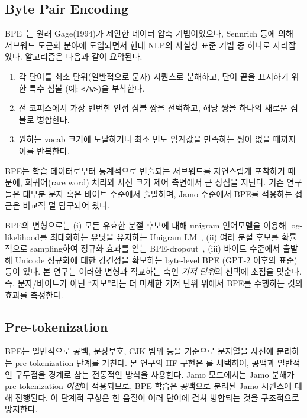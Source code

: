 \documentclass[sigconf,nonacm]{acmart}
\begin{document}
\subsection{Byte Pair Encoding}

BPE~\cite{sennrich2016bpe}는 원래 Gage(1994)가 제안한 데이터 압축 기법이었으나,
Sennrich 등에 의해 서브워드 토큰화 분야에 도입되면서 현대 NLP의 사실상 표준 기법 중 하나로
자리잡았다. 알고리즘은 다음과 같이 요약된다.
\begin{enumerate}
    \item 각 단어를 최소 단위(일반적으로 문자) 시퀀스로 분해하고, 단어 끝을 표시하기 위한 특수
    심볼 (예: \texttt{</w>})을 부착한다.
    \item 전 코퍼스에서 가장 빈번한 인접 심볼 쌍을 선택하고, 해당 쌍을 하나의 새로운 심볼로 병합한다.
    \item 원하는 vocab 크기에 도달하거나 최소 빈도 임계값을 만족하는 쌍이 없을 때까지 이를 반복한다.
\end{enumerate}
BPE는 학습 데이터로부터 통계적으로 빈출되는 서브워드를 자연스럽게 포착하기 때문에,
희귀어(rare word) 처리와 사전 크기 제어 측면에서 큰 장점을 지닌다. 기존 연구들은 대부분
문자 혹은 바이트 수준에서 출발하며, Jamo 수준에서 BPE를 적용하는 접근은 비교적 덜 탐구되어 왔다.

BPE의 변형으로는 (i) 모든 유효한 분절 후보에 대해 unigram 언어모델을 이용해 log-likelihood를
최대화하는 유닛을 유지하는 Unigram LM~\cite{kudo2018sp}, (ii) 여러 분절 후보를 확률적으로
sampling하여 정규화 효과를 얻는 BPE-dropout~\cite{provilkov2020bpedropout},
(iii) 바이트 수준에서 출발해 Unicode 정규화에 대한 강건성을 확보하는 byte-level BPE
(GPT-2 이후의 표준)~\cite{radford2019gpt2} 등이 있다. 본 연구는 이러한 변형과 직교하는 축인
\emph{기저 단위}의 선택에 초점을 맞춘다. 즉, 문자/바이트가 아닌 ``자모''라는 더 미세한 기저 단위
위에서 BPE를 수행하는 것의 효과를 측정한다.

\subsection{Pre-tokenization}

BPE는 일반적으로 공백, 문장부호, CJK 범위 등을 기준으로 문자열을 사전에 분리하는 pre-tokenization
단계를 거친다. 본 연구의 HF 구현은 를 채택하여,
공백과 일반적인 구두점을 경계로 삼는 전통적인 방식을 사용한다. Jamo 모드에서는 Jamo 분해가
pre-tokenization \emph{이전}에 적용되므로, BPE 학습은 공백으로 분리된 Jamo 시퀀스에 대해
진행된다. 이 단계적 구성은 한 음절이 여러 단어에 걸쳐 병합되는 것을 구조적으로 방지한다.
\end{document}
